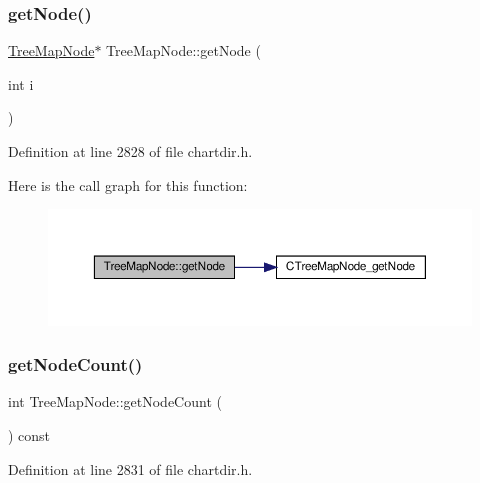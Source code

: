 \subsubsection{\texorpdfstring{get\+Node()}{getNode()}}
{\footnotesize\ttfamily \hyperlink{class_tree_map_node}{Tree\+Map\+Node}$\ast$ Tree\+Map\+Node\+::get\+Node (\begin{DoxyParamCaption}\item[{int}]{i }\end{DoxyParamCaption})\hspace{0.3cm}{\ttfamily [inline]}}



Definition at line 2828 of file chartdir.\+h.

Here is the call graph for this function\+:
\nopagebreak
\begin{figure}[H]
\begin{center}
\leavevmode
\includegraphics[width=350pt]{class_tree_map_node_adae867bee5a1cdf5fe3b632b9a55da65_cgraph}
\end{center}
\end{figure}
\mbox{\label{class_tree_map_node_a7c32668676377780aa500260f69961c8}} 
\subsubsection{\texorpdfstring{get\+Node\+Count()}{getNodeCount()}}
{\footnotesize\ttfamily int Tree\+Map\+Node\+::get\+Node\+Count (\begin{DoxyParamCaption}{ }\end{DoxyParamCaption}) const\hspace{0.3cm}{\ttfamily [inline]}}



Definition at line 2831 of file chartdir.\+h.

